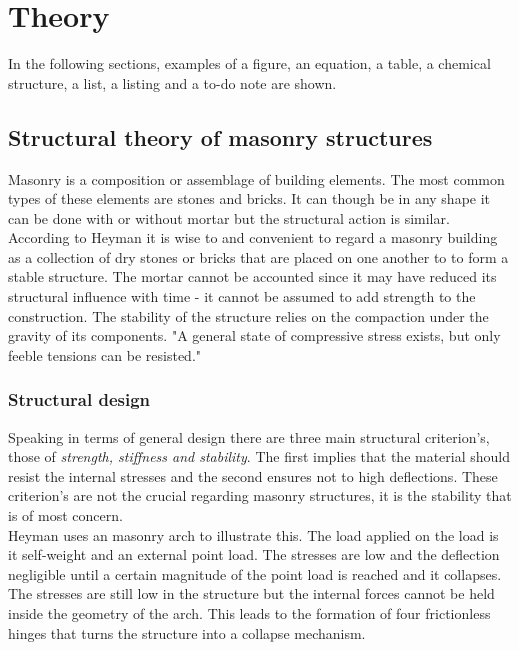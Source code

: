 \chapter{Theory}

In the following sections, examples of a figure, an equation, a table, a chemical structure, a list, a listing and a to-do note are shown.

\section{Structural theory of masonry structures}

Masonry is a composition or assemblage of building elements. The most common types of these elements are stones and bricks. It can though be in any shape it can be done with or without mortar but the structural action is similar. According to Heyman it is wise to and convenient to regard a masonry building as a collection of dry stones or bricks that are placed on one another to to form a stable structure. The mortar cannot be accounted since it may have reduced its structural influence with time - it cannot be assumed to add strength to the construction. The stability of the structure relies on the compaction under the gravity of its components. "A general state of compressive stress exists, but only feeble tensions can be resisted."\\

\subsection{Structural design}
Speaking in terms of general design there are three main structural criterion's, those of \textit{strength, stiffness and stability}. The first implies that the material should resist the internal stresses and the second ensures not to high deflections. These criterion's are not the crucial regarding masonry structures, it is the stability that is of most concern.\\

Heyman uses an masonry arch to illustrate this. The load applied on the load is it self-weight and an external point load. The stresses are low and the deflection negligible until a certain magnitude of the point load is reached and it collapses. The stresses are still low in the structure but the internal forces cannot be held inside the geometry of the arch. This leads to the formation of four frictionless hinges that turns the structure into a collapse mechanism.\\   

